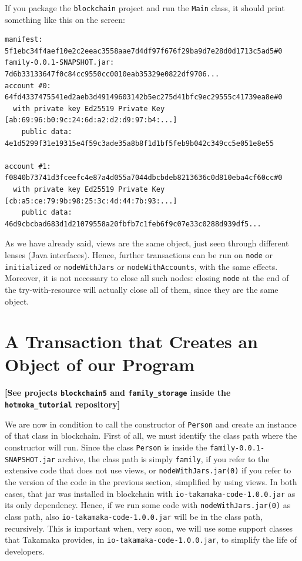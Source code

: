 \documentclass[a4paper,]{book}
\begin{document}
{If you package the \texttt{blockchain} project and run the \texttt{Main}
class, it should print something like this on the screen:

\begin{myverbatim}
\begin{verbatim}
manifest: 5f1ebc34f4aef10e2c2eeac3558aae7d4df97f676f29ba9d7e28d0d1713c5ad5#0
family-0.0.1-SNAPSHOT.jar: 7d6b33133647f0c84cc9550cc0010eab35329e0822df9706...
account #0: 64fd4337475541ed2aeb3d49149603142b5ec275d41bfc9ec29555c41739ea8e#0
  with private key Ed25519 Private Key [ab:69:96:b0:9c:24:6d:a2:d2:d9:97:b4:...]
    public data: 4e1d5299f31e19315e4f59c3ade35a8b8f1d1bf5feb9b042c349cc5e051e8e55

account #1: f0840b73741d3fceefc4e87a4d055a7044dbcbdeb8213636c0d810eba4cf60cc#0
  with private key Ed25519 Private Key [cb:a5:ce:79:9b:98:25:3c:4d:44:7b:93:...]
    public data: 46d9cbcbad683d1d21079558a20fbfb7c1feb6f9c07e33c0288d939df5...
\end{verbatim}
\end{myverbatim}

As we have already said, views are the same object, just seen through
different lenses (Java interfaces). Hence, further transactions can be
run on \texttt{node} or \texttt{initialized} or \texttt{nodeWithJars} or
\texttt{nodeWithAccounts}, with the same effects. Moreover, it is not
necessary to close all such nodes: closing \texttt{node} at the end of
the try-with-resource will actually close all of them, since they are
the same object.

\hypertarget{a-transaction-that-creates-an-object-of-our-program}{%
\section{A Transaction that Creates an Object of our Program
}\label{a-transaction-that-creates-an-object-of-our-program}}

\textbf{{[}See projects \texttt{blockchain5} and
\texttt{family\_storage} inside the \texttt{hotmoka\_tutorial}
repository{]}}

We are now in condition to call the constructor of \texttt{Person} and
create an instance of that class in blockchain. First of all, we must
identify the class path where the constructor will run. Since the class
\texttt{Person} is inside the \texttt{family-0.0.1-SNAPSHOT.jar}
archive, the class path is simply \texttt{family}, if you refer to the
extensive code that does not use views, or \texttt{nodeWithJars.jar(0)}
if you refer to the version of the code in the previous section,
simplified by using views. In both cases, that jar was installed in
blockchain with \texttt{io-takamaka-code-1.0.0.jar} as its only
dependency. Hence, if we run some code with \texttt{nodeWithJars.jar(0)}
as class path, also \texttt{io-takamaka-code-1.0.0.jar} will be in the
class path, recursively. This is important when, very soon, we will use
some support classes that Takamaka provides, in
\texttt{io-takamaka-code-1.0.0.jar}, to simplify the life of developers.

}
\end{document}
